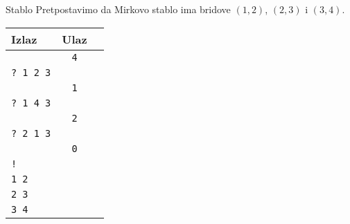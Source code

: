 \begin{statement}[
  problempoints=100,
  timelimit=3 sekundi,
  memorylimit=512 MiB,
]{Stablo}
Pretpostavimo da Mirkovo stablo ima bridove $(1, 2)$, $(2, 3)$ i $(3, 4)$.

{\renewcommand{\arraystretch}{1.4}
  \setlength{\tabcolsep}{6pt}
  \begin{tabular}{lcl}
    Izlaz & Ulaz\\ \midrule
    \texttt{} & \texttt{4} \\
    \texttt{\frenchspacing? 1 2 3} & \texttt{}  \\
    \texttt{ } & \texttt{1} \\
    \texttt{\frenchspacing? 1 4 3} & \texttt{} \\
    \texttt{ } & \texttt{2} \\
    \texttt{\frenchspacing? 2 1 3} & \texttt{} \\
    \texttt{ } & \texttt{0} \\    
    \texttt{\frenchspacing!} &\\
    \texttt{1 2} & \texttt{} \\
    \texttt{2 3} & \texttt{} \\
    \texttt{3 4} & \texttt{} \\
\end{tabular}}


\end{statement}

